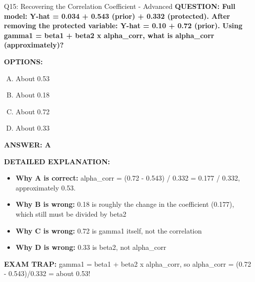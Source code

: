 \documentclass[8pt]{beamer}
\begin{document}
\begin{frame}[shrink=6]{Q15: Recovering the Correlation Coefficient - Advanced}
\fontsize{6.5}{7.5}\selectfont
\textbf{QUESTION: Full model: Y-hat = 0.034 + 0.543 (prior) + 0.332 (protected). After removing the protected variable: Y-hat = 0.10 + 0.72 (prior). Using gamma1 = beta1 + beta2 x alpha\_corr, what is alpha\_corr (approximately)?}

\vspace{0.1cm}
\textbf{OPTIONS:}
\begin{enumerate}[A.]
\item About 0.53
\item About 0.18
\item About 0.72
\item About 0.33
\end{enumerate}

\vspace{0.1cm}
\textcolor{myblue}{\textbf{ANSWER: A}}

\vspace{0.1cm}
\textbf{DETAILED EXPLANATION:}
\begin{itemize}
\item \textbf{Why A is correct:} alpha\_corr = (0.72 - 0.543) / 0.332 = 0.177 / 0.332, approximately 0.53.
\item \textbf{Why B is wrong:} 0.18 is roughly the change in the coefficient (0.177), which still must be divided by beta2
\item \textbf{Why C is wrong:} 0.72 is gamma1 itself, not the correlation
\item \textbf{Why D is wrong:} 0.33 is beta2, not alpha\_corr
\end{itemize}

\textcolor{myred}{\textbf{EXAM TRAP:}} gamma1 = beta1 + beta2 x alpha\_corr, so alpha\_corr = (0.72 - 0.543)/0.332 = about 0.53!
\end{frame}
\end{document}
